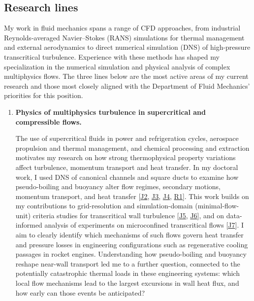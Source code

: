 \documentclass[11pt]{article}
\begin{document}
\subsection{Research lines}\label{sec:lines}

My work in fluid mechanics spans a range of CFD approaches, from industrial Reynolds-averaged Navier--Stokes (RANS) simulations for thermal management and external aerodynamics to direct numerical simulation (DNS) of high-pressure transcritical turbulence. Experience with these methods has shaped my specialization in the numerical simulation and physical analysis of complex multiphysics flows. The three lines below are the most active areas of my current research and those most closely aligned with the Department of Fluid Mechanics' priorities for this position.

\begin{enumerate}[label=\textbf{\arabic*.}, leftmargin=*, itemsep=8pt]
	
	\item \textbf{Physics of multiphysics turbulence in supercritical and compressible flows.}
	
	The use of supercritical fluids in power and refrigeration cycles, aerospace propulsion and thermal management, and chemical processing and extraction motivates my research on how strong thermophysical property variations affect turbulence, momentum transport and heat transfer. In my doctoral work, I used DNS of canonical channels and square ducts to examine how pseudo-boiling and buoyancy alter 	flow regimes, secondary motions, momentum transport, and heat transfer [\hyperlink{pub-J2}{J2}, \hyperlink{pub-J3}{J3}, \hyperlink{pub-J4}{J4}, \hyperlink{pub-R1}{R1}]. This work builds on my contributions to grid-resolution and simulation-domain (minimal-flow-unit) criteria studies for transcritical wall turbulence [\hyperlink{pub-J5}{J5}, \hyperlink{pub-J6}{J6}], and on data-informed analysis of experiments on microconfined transcritical flows [\hyperlink{pub-J7}{J7}].
	I aim to clearly identify which mechanisms of such flows govern heat transfer and pressure losses in engineering configurations such as regenerative cooling passages in rocket engines. 
	Understanding how pseudo-boiling and buoyancy reshape near-wall transport led me to a further question, connected to the potentially catastrophic thermal loads in these engineering systems: which local flow mechanisms lead to the largest excursions in wall heat flux, and how early can those events be anticipated?
	

\end{enumerate}
\end{document}
